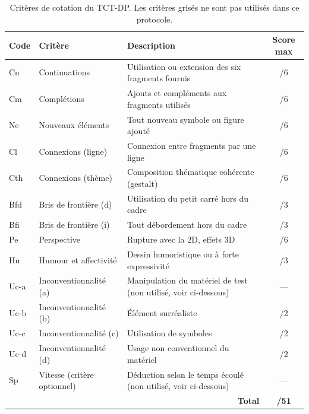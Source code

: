 \documentclass[11pt]{article}
\begin{document}
\begin{table}[H]
    \centering
    \begin{tabular}{@{}llp{6cm}c@{}}
        \toprule
        \textbf{Code} & \textbf{Critère} & \textbf{Description} & \textbf{Score max} \\
        \midrule
        Cn    & Continuations               & Utilisation ou extension des six fragments fournis & /6 \\
        Cm    & Complétions                 & Ajouts et compléments aux fragments utilisés & /6 \\
        Ne    & Nouveaux éléments           & Tout nouveau symbole ou figure ajouté & /6 \\
        Cl    & Connexions (ligne)          & Connexion entre fragments par une ligne & /6 \\
        Cth   & Connexions (thème)          & Composition thématique cohérente (gestalt) & /6 \\
        Bfd   & Bris de frontière (d)       & Utilisation du petit carré hors du cadre & /3 \\
        Bfi   & Bris de frontière (i)       & Tout débordement hors du cadre & /3 \\
        Pe    & Perspective                 & Rupture avec la 2D, effets 3D & /6 \\
        Hu    & Humour et affectivité       & Dessin humoristique ou à forte expressivité & /3 \\
        \rowcolor{gray!15} Uc-a & Inconventionnalité (a) & Manipulation du matériel de test (non utilisé, voir ci-dessous) & --- \\
        Uc-b  & Inconventionnalité (b)      & Élément surréaliste & /2 \\
        Uc-c  & Inconventionnalité (c)      & Utilisation de symboles & /2 \\
        Uc-d  & Inconventionnalité (d)      & Usage non conventionnel du matériel & /2 \\
        \rowcolor{gray!15} Sp   & Vitesse (critère optionnel) & Déduction selon le temps écoulé (non utilisé, voir ci-dessous) & --- \\
        \midrule
        \multicolumn{3}{r}{\textbf{Total}} & \textbf{/51} \\
        \bottomrule
    \end{tabular}
    \caption{Critères de cotation du TCT-DP. Les critères grisés ne sont pas utilisés dans ce protocole.}
    \label{tab:tct_dp_criteres}
\end{table}
\end{document}
